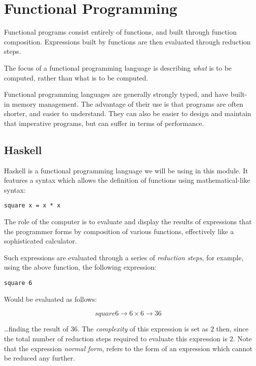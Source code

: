 \section{Functional Programming}
Functional programs consist entirely of functions, and built through function composition.
Expressions built by functions are then evaluated through reduction steps.

The focus of a functional programming language is describing \textit{what} is to be computed, rather than what is to be computed.

Functional programming languages are generally strongly typed, and have built-in memory
management. The advantage of their use is that programs are often shorter, and easier
to understand. They can also be easier to design and maintain that imperative programs,
but can suffer in terms of performance.

\subsection{Haskell}
Haskell is a functional programming language we will be using in this module. It features
a syntax which allows the definition of functions using mathematical-like syntax:

\begin{lstlisting}
square x = x * x
\end{lstlisting}

The role of the computer is to evaluate and display the results of expressions that the
programmer forms by composition of various functions, effectively like a sophisticated
calculator.

Such expressions are evaluated through a series of \textit{reduction steps}, for example,
using the above function, the following expression:

\begin{lstlisting}
square 6
\end{lstlisting}

Would be evaluated as follows:

\begin{equation}
square 6 \to 6\times6 \to 36
\end{equation}

\ldots finding the result of $36$. The \textit{complexity} of this expression is set as
$2$ then, since the total number of reduction steps required to evaluate this expression is $2$.
Note that the expression \textit{normal form}, refers to the form of an expression which
cannot be reduced any further.


